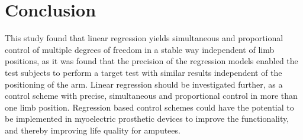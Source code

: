 \section{Conclusion}

This study found that linear regression yields simultaneous and proportional control of multiple degrees of freedom in a stable way independent of limb positions, as it was found that the precision of the regression models enabled the test subjects to perform a target test with similar results independent of the positioning of the arm. Linear regression should be investigated further, as a control scheme with precise, simultaneous and proportional control in more than one limb position. Regression based control schemes could have the potential to be implemented in myoelectric prosthetic devices to improve the functionality, and thereby improving life quality for amputees.